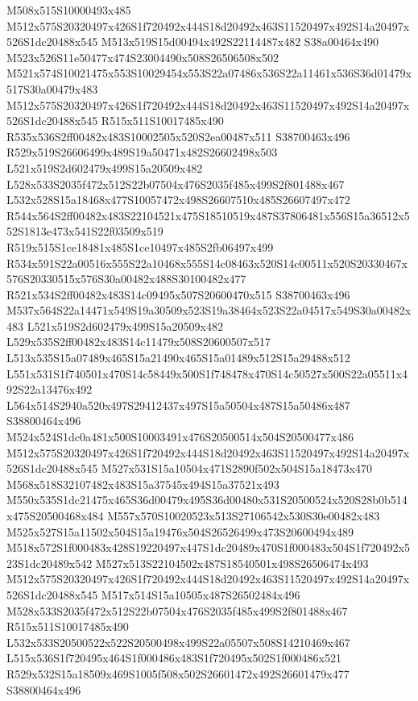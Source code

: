 \documentclass{article}
\begin{document}
\begin{multicols}{2}
M508x515S10000493x485 M512x575S20320497x426S1f720492x444S18d20492x463S11520497x492S14a20497x526S1dc20488x545 M513x519S15d00494x492S22114487x482 S38a00464x490 M523x526S11e50477x474S23004490x508S26506508x502 M521x574S10021475x553S10029454x553S22a07486x536S22a11461x536S36d01479x517S30a00479x483 M512x575S20320497x426S1f720492x444S18d20492x463S11520497x492S14a20497x526S1dc20488x545 R515x511S10017485x490 R535x536S2ff00482x483S10002505x520S2ea00487x511 S38700463x496 R529x519S26606499x489S19a50471x482S26602498x503 L521x519S2d602479x499S15a20509x482 L528x533S2035f472x512S22b07504x476S2035f485x499S2f801488x467 L532x528S15a18468x477S10057472x498S26607510x485S26607497x472 R544x564S2ff00482x483S22104521x475S18510519x487S37806481x556S15a36512x552S1813e473x541S22f03509x519 R519x515S1ce18481x485S1ce10497x485S2fb06497x499 R534x591S22a00516x555S22a10468x555S14c08463x520S14c00511x520S20330467x576S20330515x576S30a00482x488S30100482x477 R521x534S2ff00482x483S14c09495x507S20600470x515 S38700463x496 M537x564S22a14471x549S19a30509x523S19a38464x523S22a04517x549S30a00482x483 L521x519S2d602479x499S15a20509x482 L529x535S2ff00482x483S14c11479x508S20600507x517 L513x535S15a07489x465S15a21490x465S15a01489x512S15a29488x512 L551x531S1f740501x470S14c58449x500S1f748478x470S14c50527x500S22a05511x492S22a13476x492 L564x514S2940a520x497S29412437x497S15a50504x487S15a50486x487 S38800464x496 M524x524S1dc0a481x500S10003491x476S20500514x504S20500477x486 M512x575S20320497x426S1f720492x444S18d20492x463S11520497x492S14a20497x526S1dc20488x545 M527x531S15a10504x471S2890f502x504S15a18473x470 M568x518S32107482x483S15a37545x494S15a37521x493 M550x535S1dc21475x465S36d00479x495S36d00480x531S20500524x520S28b0b514x475S20500468x484 M557x570S10020523x513S27106542x530S30e00482x483 M525x527S15a11502x504S15a19476x504S26526499x473S20600494x489 M518x572S1f000483x428S19220497x447S1dc20489x470S1f000483x504S1f720492x523S1dc20489x542 M527x513S22104502x487S18540501x498S26506474x493 M512x575S20320497x426S1f720492x444S18d20492x463S11520497x492S14a20497x526S1dc20488x545 M517x514S15a10505x487S26502484x496 M528x533S2035f472x512S22b07504x476S2035f485x499S2f801488x467 R515x511S10017485x490 L532x533S20500522x522S20500498x499S22a05507x508S14210469x467 L515x536S1f720495x464S1f000486x483S1f720495x502S1f000486x521 R529x532S15a18509x469S1005f508x502S26601472x492S26601479x477 S38800464x496



\end{multicols}
\end{document}
